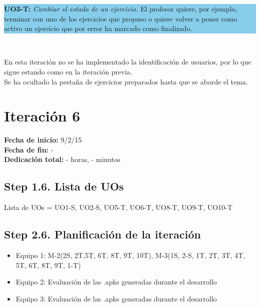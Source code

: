 \vspace{0.1cm}

\colorbox{SkyBlue}{\parbox[c]{1.0\textwidth}{
\textbf{UO3-T:} \textit{Cambiar el estado de un ejercicio.} El profesor quiere, por ejemplo, terminar con uno de los ejercicios que propuso o quiere volver a poner como activo un ejercicio que por error ha marcado como finalizado.\\
}}\\

\vspace{0.1cm}

En esta iteración no se ha implementado la identificación de usuarios, por lo que sigue estando como en la iteración previa.\\

Se ha ocultado la pestaña de ejercicios preparados hasta que se aborde el tema.\\


\section{Iteración 6}
\label{it6}

\begin{flushleft}
\textbf{Fecha de inicio:} 9/2/15\\
\textbf{Fecha de fin:} -\\
\textbf{Dedicación total:} - horas, - minutos\\
\end{flushleft}

\subsection{Step 1.6. Lista de UOs}
\label{it6:1.6}

Lista de UOs = {UO1-S, UO2-S, UO5-T, UO6-T, UO8-T, UO9-T, UO10-T}

\subsection{Step 2.6. Planificación de la iteración}
\label{it6:2.6}

\begin{itemize}
\item Equipo 1: M-2(2S, 2T,5T, 6T, 8T, 9T, 10T), M-3(1S, 2-S, 1T, 2T, 3T, 4T, 5T, 6T, 8T, 9T, 1-T)
\item Equipo 2: Evaluación de las .apks generadas durante el desarrollo
\item Equipo 3: Evaluación de las .apks generadas durante el desarrollo
\end{itemize}

